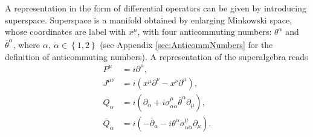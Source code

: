 A representation in the form of differential operators can be given by introducing superspace. Superspace is a manifold obtained by enlarging Minkowski space, whose coordinates are label with $x^\mu$, with four anticommuting numbers: $\theta^\alpha$ and $\overline{\theta}^{\dot{\alpha}}$, where $\alpha,\ \dot{\alpha} \in \left\{ 1,2 \right\}$ (see Appendix \ref{sec:AnticommNumbers} for the definition of anticommuting numbers). A representation of the superalgebra reads
\begin{align}
P^\mu &= i\partial^\mu,\nonumber\\
J^{\mu\nu} &= i(x^\mu\partial^\nu - x^\nu\partial^\mu),\nonumber\\
Q_\alpha &= i(\partial_\alpha + i\sigma^\mu_{\alpha\dot{\alpha}}
\overline{\theta}^{\dot{\alpha}}\partial_\mu),\nonumber\\
\overline{Q}_{\dot{\alpha}} &= i(-\overline{\partial}_{\dot{\alpha}} - i \theta^\alpha \sigma^\mu_{\alpha\dot{\alpha}}\partial_\mu).\label{eq:SUSYGen}
\end{align}




